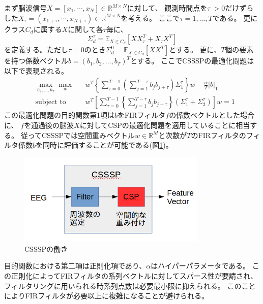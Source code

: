 まず脳波信号\(X = \left[ x_1, \cdots, x_N \right] \in \mathbb{R}^{M \times N}\)に対して、
観測時間点を\(\tau\ > 0\)だけずらした\(X_{\tau} = \left( x_{1+\tau}, \cdots, x_{N+\tau} \right) \in \mathbb{R}^{M \times N}\)を考える。
ここで$\tau = 1,\ldots,T$である。
更にクラス\( C_d \)に属する\( X \)に関して各\(\tau\)毎に、
\begin{equation}
    \Sigma_{d}^{\tau} = \mathbb E_{X \in C_d} \left[ XX_{\tau}^T + X_{\tau}X^T \right]
\end{equation}
を定義する。ただし\(\tau=0\)のとき\( \Sigma_{d}^{0} = \mathbb E_{X \in C_d} \left[XX^T \right] \)とする。
更に、\(T\)個の要素を持つ係数ベクトル$b=(b_1,b_2,\ldots,b_T)^T$とする。
ここでCSSSPの最適化問題は以下で表現される。
\begin{equation}
    \begin{aligned}
        & \max_{b_2,\ldots,b_T} \max_{w}
        & & w^T \left\{ \sum_{\tau = 0}^{T-1} \left( \sum_{j=1}^{T-\tau} b_j b_{j+\tau} \right) \Sigma_1^{\tau} \right\} w - \frac{\alpha}{T}|b|_1 \\
        & \text{subject to}
        & &  w^T \left[\sum_{\tau = 0}^{T-1} \left\{ \sum_{j=1}^{T-\tau}b_jb_{j+\tau} \right\} (\Sigma_1^{\tau} + \Sigma_2^{\tau}) \right] w = 1
    \end{aligned}
    \label{eq:csssp}
\end{equation}
この最適化問題の目的関数第1項は\(b\)をFIRフィルタ\(f\)の係数ベクトルとした場合に、
\(f\)を通過後の脳波\(X\)に対してCSPの最適化問題を適用していることに相当する。
従ってCSSSPでは空間重みベクトル\(w \in \mathbb R^M\)と次数が\(T\)のFIRフィルタのフィルタ係数\(b\)を同時に評価することが可能である(図\ref{fig:CSSSP})。
\begin{figure}
    \centering
    \includegraphics[width=9cm]{images/CSSSP.png}
    \caption{CSSSPの働き}
    \label{fig:CSSSP}
\end{figure}
目的関数における第二項は正則化項であり、$\alpha$はハイパーパラメータである。
この正則化によってFIRフィルタの系列ベクトルに対してスパース性が要請され、
フィルタリングに用いられる時系列点数は必要最小限に抑えられる。
このことによりFIRフィルタが必要以上に複雑になることが避けられる。

